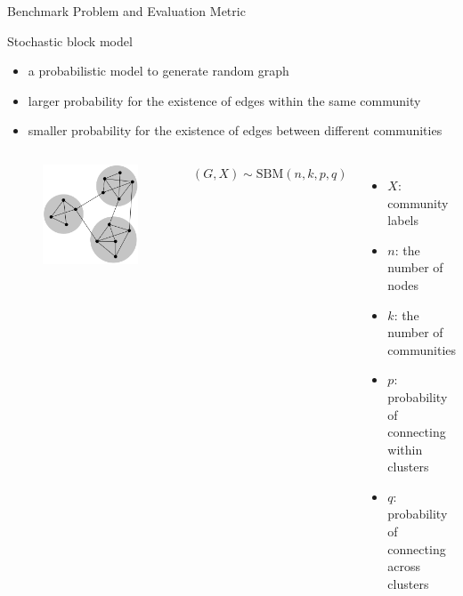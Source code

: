 \documentclass[notheorems]{beamer}
\begin{document}
\begin{frame}{Benchmark Problem and Evaluation Metric}
		\begin{block}{Stochastic block model}
		\begin{itemize}
		\item a probabilistic model to generate random graph
		\item larger probability for the existence of edges within the same community
		\item smaller probability for the existence of edges between different communities
		\end{itemize}
		\end{block}
		\begin{columns}
				\begin{figure}
				\includegraphics[width=\textwidth]{sbm.png}
			\end{figure}
		\quad$(G,X)\sim \textrm{SBM}(n, k, p, q)$
		\begin{itemize}
			\item $X$: community labels
			\item $n$: the number of nodes
			\item $k$: the number of communities
			\item $p$: probability of connecting within clusters
			\item $q$: probability of connecting across clusters
		\end{itemize}
		\end{columns}
\end{frame}
\end{document}
